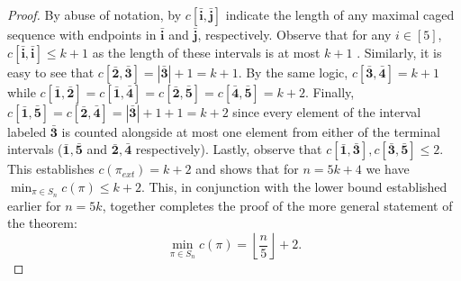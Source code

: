\documentclass[11pt, a4paper]{article}
\theoremstyle{compact}
\begin{document}
\begin{proof}
    By abuse of notation, by $c[\bar{\mathbf{i}}, \bar{\mathbf{j}}]$ indicate the length of any maximal caged sequence with endpoints in $\bar{\mathbf{i}}$ and $\bar{\mathbf{j}}$, respectively.  Observe that for any $i \in [5]$, $c[\bar{\mathbf{i}}, \bar{\mathbf{i}}] \leq k +1$ as the length of these intervals is at most $k + 1$ . Similarly, it is easy to see that $c[\bar{\mathbf{2}}, \bar{\mathbf{3}}] = |\bar{\mathbf{3}}| + 1 = k + 1$. By the same logic, $c[\bar{\mathbf{3}}, \bar{\mathbf{4}}] = k + 1 $ while $c[\bar{\mathbf{1}}, \bar{\mathbf{2}}] = c[\bar{\mathbf{1}}, \bar{\mathbf{4}}]= c[\bar{\mathbf{2}}, \bar{\mathbf{5}}] = c[\bar{\mathbf{4}}, \bar{\mathbf{5}}]= k + 2$. Finally, $c[\bar{\mathbf{1}}, \bar{\mathbf{5}}] = c[\bar{\mathbf{2}}, \bar{\mathbf{4}}] = |\bar{\mathbf{3}}| + 1 + 1 = k + 2$ since every element of the interval labeled $\bar{\mathbf{3}}$  is counted alongside at most one element from either of the terminal intervals ($\bar{\mathbf{1}}, \bar{\mathbf{5}}$ and $\bar{\mathbf{2}}, \bar{\mathbf{4}}$ respectively). Lastly, observe that $c[\bar{\mathbf{1}}, \bar{\mathbf{3}}], c[\bar{\mathbf{3}}, \bar{\mathbf{5}}]\le 2$. This establishes $c(\pi_{ext}) = k + 2$ and
 shows that for $n = 5k + 4$ we have $\min_{\pi \in S_n} c (\pi)\le k+2$. This, in conjunction with the lower bound established earlier for $n=5k$, together completes the proof of the more general statement of the theorem:
    \[
    \min_{\pi \in S_n} c (\pi) = \left\lfloor\frac{n}{5}\right\rfloor + 2.
    \]  
\end{proof}
\end{document}
